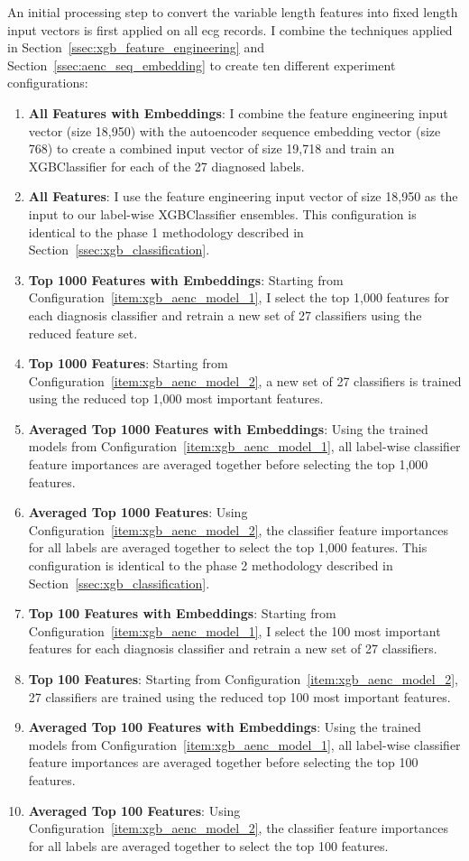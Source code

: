 \documentclass[\main/thesis.tex]{subfiles}
\begin{document}
An initial processing step to convert the variable length features into fixed length input vectors is first applied on all \gls{ecg} records.
I combine the techniques applied in Section~\ref{ssec:xgb_feature_engineering} and Section~\ref{ssec:aenc_seq_embedding} to create ten different experiment configurations:
\begin{enumerate}
    \item \label{item:xgb_aenc_model_1} \textbf{All Features with Embeddings}: I combine the feature engineering input vector (size 18,950) with the autoencoder sequence embedding vector (size 768) to create a combined input vector of size 19,718 and train an XGBClassifier for each of the 27 diagnosed labels.
    \item \label{item:xgb_aenc_model_2} \textbf{All Features}: I use the feature engineering input vector of size 18,950 as the input to our label-wise XGBClassifier ensembles.
    This configuration is identical to the phase 1 methodology described in Section~\ref{ssec:xgb_classification}.
    \item \label{item:xgb_aenc_model_3} \textbf{Top 1000 Features with Embeddings}: Starting from Configuration~\ref{item:xgb_aenc_model_1}, I select the top 1,000 features for each diagnosis classifier and retrain a new set of 27 classifiers using the reduced feature set.
    \item \textbf{Top 1000 Features}: Starting from Configuration~\ref{item:xgb_aenc_model_2}, a new set of 27 classifiers is trained using the reduced top 1,000 most important features.
    \item \textbf{Averaged Top 1000 Features with Embeddings}: Using the trained models from Configuration~\ref{item:xgb_aenc_model_1}, all label-wise classifier feature importances are averaged together before selecting the top 1,000 features.
    \item \textbf{Averaged Top 1000 Features}: Using Configuration~\ref{item:xgb_aenc_model_2}, the classifier feature importances for all labels are averaged together to select the top 1,000 features.
    This configuration is identical to the phase 2 methodology described in Section~\ref{ssec:xgb_classification}.
    \item \label{item:xgb_aenc_model_5} \textbf{Top 100 Features with Embeddings}: Starting from Configuration~\ref{item:xgb_aenc_model_1}, I select the 100 most important features for each diagnosis classifier and retrain a new set of 27 classifiers.
    \item \textbf{Top 100 Features}: Starting from Configuration~\ref{item:xgb_aenc_model_2}, 27 classifiers are trained using the reduced top 100 most important features.
    \item \textbf{Averaged Top 100 Features with Embeddings}: Using the trained models from Configuration~\ref{item:xgb_aenc_model_1}, all label-wise classifier feature importances are averaged together before selecting the top 100 features.
    \item \textbf{Averaged Top 100 Features}: Using Configuration~\ref{item:xgb_aenc_model_2}, the classifier feature importances for all labels are averaged together to select the top 100 features.
\end{enumerate}
\end{document}
